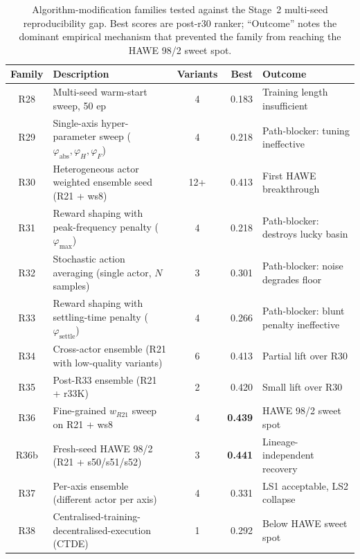 \documentclass{unnc-fyp}
\begin{document}
\begin{table}[tb]
  \centering
  \small
  \caption{Algorithm-modification families tested against the
           Stage~2 multi-seed reproducibility gap. Best scores are
           post-r30 ranker; ``Outcome'' notes the dominant
           empirical mechanism that prevented the family from
           reaching the HAWE 98/2 sweet spot.}
  \label{tab:s2-negative-results}
  \begin{tabular}{@{}clcrl@{}}
    \toprule
    Family & Description & Variants & Best & Outcome \\
    \midrule
    R28 & Multi-seed warm-start sweep, 50 ep
        & 4   & 0.183 & Training length insufficient \\
    R29 & Single-axis hyper-parameter sweep
          ($\varphi_\mathrm{abs}, \varphi_H, \varphi_F$)
        & 4   & 0.218 & Path-blocker: tuning ineffective \\
    R30 & Heterogeneous actor weighted ensemble seed
          (R21 + ws8)
        & 12+ & 0.413 & First HAWE breakthrough \\
    R31 & Reward shaping with peak-frequency penalty
          ($\varphi_\mathrm{max}$)
        & 4   & 0.218 & Path-blocker: destroys lucky basin \\
    R32 & Stochastic action averaging
          (single actor, $N$ samples)
        & 3   & 0.301 & Path-blocker: noise degrades floor \\
    R33 & Reward shaping with settling-time penalty
          ($\varphi_\mathrm{settle}$)
        & 4   & 0.266 & Path-blocker: blunt penalty ineffective \\
    R34 & Cross-actor ensemble
          (R21 with low-quality variants)
        & 6   & 0.413 & Partial lift over R30 \\
    R35 & Post-R33 ensemble (R21 + r33K)
        & 2   & 0.420 & Small lift over R30 \\
    R36 & Fine-grained $w_{R21}$ sweep on R21 + ws8
        & 4   & \textbf{0.439} & HAWE 98/2 sweet spot \\
    R36b & Fresh-seed HAWE 98/2 (R21 + s50/s51/s52)
        & 3   & \textbf{0.441} & Lineage-independent recovery \\
    R37 & Per-axis ensemble (different actor per axis)
        & 4   & 0.331 & LS1 acceptable, LS2 collapse \\
    R38 & Centralised-training-decentralised-execution (CTDE)
        & 1   & 0.292 & Below HAWE sweet spot \\
    \bottomrule
  \end{tabular}
\end{table}
\end{document}
